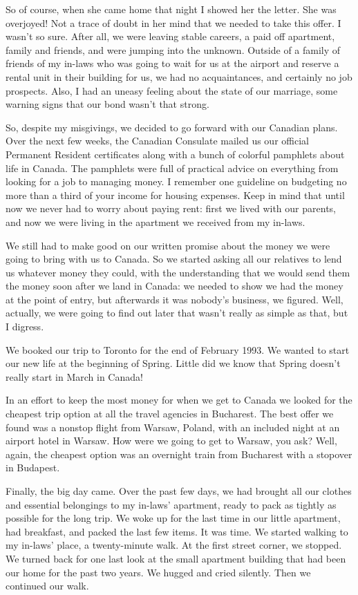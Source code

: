 \documentclass[12pt]{book}
\begin{document}
So of course, when she came home that night I showed her the letter. She
was overjoyed! Not a trace of doubt in her mind that we needed to take
this offer. I wasn't so sure. After all, we were leaving stable careers,
a paid off apartment, family and friends, and were jumping into the
unknown. Outside of a family of friends of my in-laws who was going to
wait for us at the airport and reserve a rental unit in their building
for us, we had no acquaintances, and certainly no job prospects. Also, I
had an uneasy feeling about the state of our marriage, some warning
signs that our bond wasn't that strong.

So, despite my misgivings, we decided to go forward with our Canadian
plans. Over the next few weeks, the Canadian Consulate mailed us our
official Permanent Resident certificates along with a bunch of colorful
pamphlets about life in Canada. The pamphlets were full of practical
advice on everything from looking for a job to managing money. I
remember one guideline on budgeting no more than a third of your income
for housing expenses. Keep in mind that until now we never had to worry
about paying rent: first we lived with our parents, and now we were
living in the apartment we received from my in-laws.

We still had to make good on our written promise about the money we were
going to bring with us to Canada. So we started asking all our relatives
to lend us whatever money they could, with the understanding that we
would send them the money soon after we land in Canada: we needed to
show we had the money at the point of entry, but afterwards it was
nobody's business, we figured. Well, actually, we were going to find out
later that wasn't really as simple as that, but I digress.

We booked our trip to Toronto for the end of February 1993. We wanted to
start our new life at the beginning of Spring. Little did we know that
Spring doesn't really start in March in Canada!

In an effort to keep the most money for when we get to Canada we looked
for the cheapest trip option at all the travel agencies in Bucharest.
The best offer we found was a nonstop flight from Warsaw, Poland, with
an included night at an airport hotel in Warsaw. How were we going to
get to Warsaw, you ask? Well, again, the cheapest option was an
overnight train from Bucharest with a stopover in Budapest.

Finally, the big day came. Over the past few days, we had brought all
our clothes and essential belongings to my in-laws' apartment, ready to
pack as tightly as possible for the long trip. We woke up for the last
time in our little apartment, had breakfast, and packed the last few
items. It was time. We started walking to my in-laws' place, a
twenty-minute walk. At the first street corner, we stopped. We turned
back for one last look at the small apartment building that had been our
home for the past two years. We hugged and cried silently. Then we
continued our walk.
\end{document}
